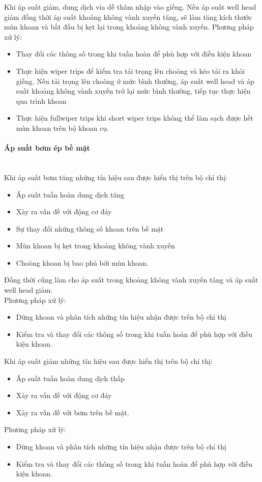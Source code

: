 \documentclass[12pt,a4paper]{article}
\newcommand{\subsubsubsection}[1]{\paragraph{#1}\mbox{}\\}
\begin{document}
	Khi áp suất giảm, dung dịch vỉa dễ thâm nhập vào giếng. Nếu áp suất well head giảm đồng thời áp suất khoảng không vành xuyến tăng, sẽ làm tăng kích thước mùn khoan và bắt đầu bị kẹt lại trong khoảng không vành xuyến. 
	Phương pháp xử lý:
	\begin{itemize}
		\item Thay đổi các thông số trong khi tuần hoàn để phù hợp với điều kiện khoan 
		\item Thực hiện wiper trips để kiểm tra tải trọng lên choòng và kéo tải ra khỏi giếng. Nếu tải trọng lên choòng ở mức bình thường, áp suất well head và áp suất khoảng không vành xuyến trở lại mức bình thường, tiếp tục thực hiện qua trình khoan
		\item Thực hiện fullwiper trips khi short wiper trips không thể làm sạch được hết mùn khoan trên bộ khoan cụ.
	\end{itemize}
	\subsubsubsection{Áp suất bơm ép bề mặt}
	Khi áp suất bơm tăng những tín hiệu sau được hiển thị trên bộ chỉ thị:
	\begin{itemize}
		\item Áp suất tuần hoàn dung dịch tăng
		\item Xảy ra vấn đề với động cơ đáy
		\item Sự thay đổi những thông số khoan trên bề mặt
		\item Mùn khoan bị kẹt trong khoảng không vành xuyến
		\item Choòng khoan bị bao phủ bởi mùn khoan.
	\end{itemize}
	Đồng thời cũng làm cho áp suất trong khoảng không vành xuyến tăng và áp suất well head giảm.\\
	Phương pháp xử lý:
	\begin{itemize}
		\item Dừng khoan và phân tích những tín hiệu nhận được trên bộ chỉ thị
		\item Kiểm tra và thay đổi các thông số trong khi tuần hoàn để phù hợp với điều kiện khoan.
	\end{itemize}
	Khi áp suất giảm những tín hiệu sau được hiển thị trên bộ chỉ thị:
	\begin{itemize}
		\item Áp suất tuần hoàn dung dịch thấp
		\item Xảy ra vấn đề với động cơ đáy
		\item Xảy ra vấn đề với bơm trên bề mặt.
	\end{itemize}
	Phương pháp xử lý:
	\begin{itemize}
		\item Dừng khoan và phân tích những tín hiệu nhận được trên bộ chỉ thị
		\item Kiểm tra và thay đổi các thông số trong khi tuần hoàn để phù hợp với điều kiện khoan.
	\end{itemize}
\end{document}
